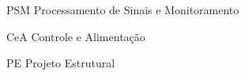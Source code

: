 \begin{siglas}
  \item[PSM] Processamento de Sinais e Monitoramento
  \item[CeA] Controle e Alimentação
  \item[PE] Projeto Estrutural
\end{siglas}
